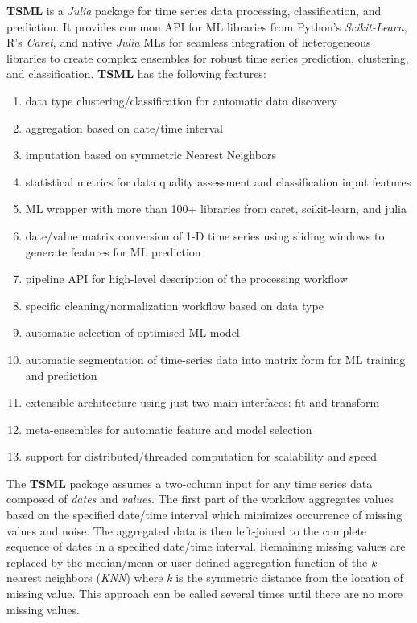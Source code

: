 \documentclass{juliacon}
\begin{document}
\textbf{TSML}\cite{tsml2019} is a \emph{Julia}\cite{bezanson2017julia} package for time series data processing, classification, and prediction. 
It provides common API for ML libraries from Python's \emph{Scikit-Learn}, 
R's \emph{Caret}, and native \emph{Julia} MLs for seamless integration of heterogeneous 
libraries to create complex ensembles for robust time series prediction, clustering, and classification.
\textbf{TSML} has the following features:
\begin{enumerate}
\item data type clustering/classification for automatic data discovery
\item aggregation based on date/time interval
\item imputation based on symmetric Nearest Neighbors
\item statistical metrics for data quality assessment and classification input features
\item ML wrapper with more than 100+ libraries from caret, scikit-learn, and julia
\item date/value matrix conversion of 1-D time series using sliding windows to generate features for ML prediction
\item pipeline API for high-level description of the processing workflow
\item specific cleaning/normalization workflow based on data type
\item automatic selection of optimised ML model
\item automatic segmentation of time-series data into matrix form for ML training and prediction 
\item extensible architecture using just two main interfaces: fit and transform
\item meta-ensembles for automatic feature and model selection
\item support for distributed/threaded computation for scalability and speed
\end{enumerate}

The \textbf{TSML} package assumes a two-column input for any time series data composed of \emph{dates} and \emph{values}. The first part of the workflow aggregates values based on the specified date/time interval which minimizes occurrence of missing values and noise. The aggregated data is then left-joined to the complete sequence of dates in a specified date/time interval. Remaining missing values are replaced by the median/mean or user-defined aggregation function of the \textit{k}-nearest neighbors (\emph{KNN}) where \textit{k} is the symmetric distance from the location of missing value. This approach can be called several times until there are no more missing values.
\end{document}
